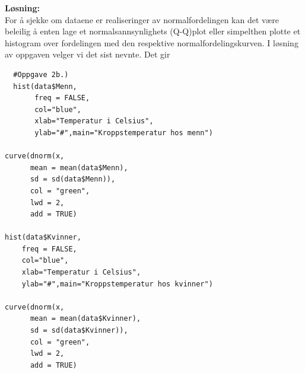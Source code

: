 \documentclass[12pt,
               a4paper,
               article,
               oneside,
               oldfontcommands,
               norsk]{memoir}
\begin{document}
\textbf{Løsning:}\vspace{4mm}\\ 
For å sjekke om dataene er realiseringer av normalfordelingen kan det være beleilig å enten lage et normalsannsynlighets (Q-Q)plot eller simpelthen plotte et histogram over fordelingen med den respektive normalfordelingskurven. I løsning av oppgaven velger vi det sist nevnte. Det gir 
\begin{lstlisting}
  #Oppgave 2b.)
  hist(data$Menn, 
       freq = FALSE, 
       col="blue", 
       xlab="Temperatur i Celsius", 
       ylab="#",main="Kroppstemperatur hos menn")

curve(dnorm(x, 
      mean = mean(data$Menn), 
      sd = sd(data$Menn)),
      col = "green",
      lwd = 2,
      add = TRUE)

hist(data$Kvinner, 
    freq = FALSE, 
    col="blue", 
    xlab="Temperatur i Celsius", 
    ylab="#",main="Kroppstemperatur hos kvinner")

curve(dnorm(x, 
      mean = mean(data$Kvinner), 
      sd = sd(data$Kvinner)),
      col = "green",
      lwd = 2,
      add = TRUE)
\end{lstlisting}
\end{document}
